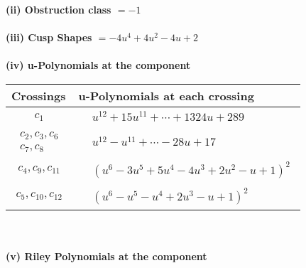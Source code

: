 \documentclass[1p]{elsarticle_modified}
\theoremstyle{definition}
\begin{document}
\flushleft \textbf{(ii) Obstruction class $= -1$}\\~\\
\flushleft \textbf{(iii) Cusp Shapes $= -4 u^4+4 u^2-4 u+2$}\\~\\
\newpage\renewcommand{\arraystretch}{1}
\flushleft \textbf{(iv) u-Polynomials at the component}\newline \\
\begin{tabular}{m{50pt}|m{274pt}}
Crossings & \hspace{64pt}u-Polynomials at each crossing \\
\hline $$\begin{aligned}c_{1}\end{aligned}$$&$\begin{aligned}
&u^{12}+15 u^{11}+\cdots+1324 u+289
\end{aligned}$\\
\hline $$\begin{aligned}c_{2},c_{3},c_{6}\\c_{7},c_{8}\end{aligned}$$&$\begin{aligned}
&u^{12}- u^{11}+\cdots-28 u+17
\end{aligned}$\\
\hline $$\begin{aligned}c_{4},c_{9},c_{11}\end{aligned}$$&$\begin{aligned}
&(u^6-3 u^5+5 u^4-4 u^3+2 u^2- u+1)^2
\end{aligned}$\\
\hline $$\begin{aligned}c_{5},c_{10},c_{12}\end{aligned}$$&$\begin{aligned}
&(u^6- u^5- u^4+2 u^3- u+1)^2
\end{aligned}$\\
\hline
\end{tabular}\\~\\
\newpage\renewcommand{\arraystretch}{1}
\flushleft \textbf{(v) Riley Polynomials at the component}\newline \\
\end{document}
